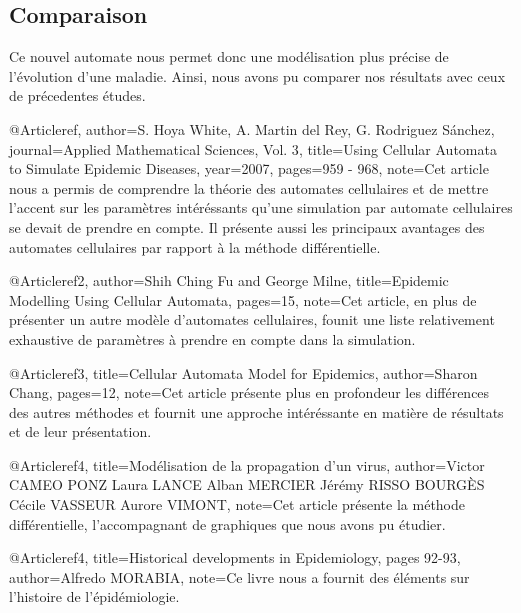 \documentclass{article}
\begin{document}
 \subsection{Comparaison}
Ce nouvel automate nous permet donc une modélisation plus précise de l'évolution d'une maladie. Ainsi, nous avons pu comparer nos résultats avec ceux de précedentes études.
\nocite{*}
\newpage




@Article{ref,
    author={S. Hoya White, A. Martin del Rey, G. Rodriguez Sánchez},
    journal={Applied Mathematical Sciences, Vol. 3},
    title={Using Cellular Automata to Simulate Epidemic Diseases},
    year={2007},
    pages={959 - 968},
    note={Cet article nous a permis de comprendre la théorie des automates cellulaires
          et de mettre l'accent sur les paramètres intéréssants qu'une simulation
          par automate cellulaires se devait de prendre en compte. Il présente aussi les
          principaux avantages des automates cellulaires par rapport à la méthode différentielle.}
}

@Article{ref2,
    author={Shih Ching Fu and George Milne},
    title={Epidemic Modelling Using Cellular Automata},
    pages={15},
    note={Cet article, en plus de présenter un autre modèle d'automates cellulaires, founit
            une liste relativement exhaustive de paramètres à prendre en compte dans la
            simulation.}
}

@Article{ref3,
    title={Cellular Automata Model for Epidemics},
    author={Sharon Chang},
    pages={12},
    note={Cet article présente plus en profondeur les différences des autres méthodes 
    et fournit une approche intéréssante en matière de résultats et de leur présentation.}
}

@Article{ref4,
    title={Modélisation de la propagation d’un virus},
    author={Victor CAMEO PONZ Laura LANCE Alban MERCIER Jérémy RISSO BOURGÈS Cécile VASSEUR Aurore VIMONT},
    note={Cet article présente la méthode différentielle, l'accompagnant de graphiques que nous avons pu étudier.}
}

@Article{ref4,
    title={Historical developments in Epidemiology, pages 92-93},
    author={Alfredo MORABIA},
    note={Ce livre nous a fournit des éléments sur l'histoire de l'épidémiologie.}
}
\end{document}
